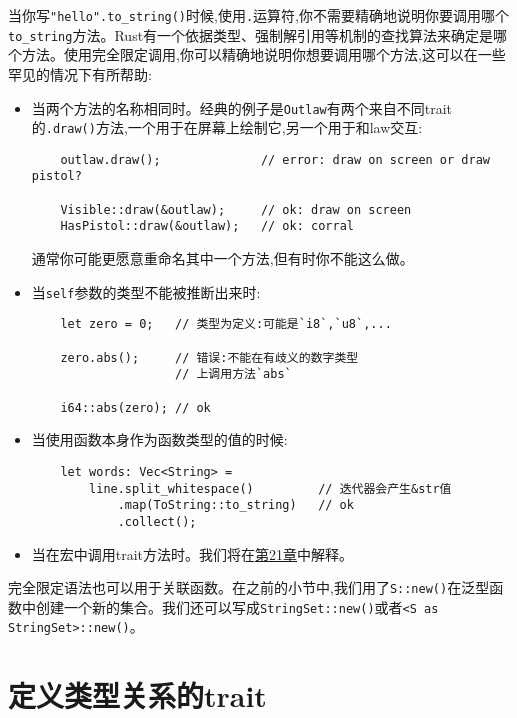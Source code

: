 当你写\texttt{"hello".to\_string()}时候,使用\texttt{.}运算符,你不需要精确地说明你要调用哪个\texttt{to\_string}方法。Rust有一个依据类型、强制解引用等机制的查找算法来确定是哪个方法。使用完全限定调用,你可以精确地说明你想要调用哪个方法,这可以在一些罕见的情况下有所帮助:
\begin{itemize}
    \item 当两个方法的名称相同时。经典的例子是\texttt{Outlaw}有两个来自不同trait的\texttt{.draw()}方法,一个用于在屏幕上绘制它,另一个用于和law交互:
    \begin{verbatim}
    outlaw.draw();              // error: draw on screen or draw pistol?

    Visible::draw(&outlaw);     // ok: draw on screen
    HasPistol::draw(&outlaw);   // ok: corral
    \end{verbatim}

    通常你可能更愿意重命名其中一个方法,但有时你不能这么做。

    \item 当\texttt{self}参数的类型不能被推断出来时:
    \begin{verbatim}
    let zero = 0;   // 类型为定义:可能是`i8`,`u8`,...

    zero.abs();     // 错误:不能在有歧义的数字类型
                    // 上调用方法`abs`

    i64::abs(zero); // ok
    \end{verbatim}

    \item 当使用函数本身作为函数类型的值的时候:
    \begin{verbatim}
    let words: Vec<String> =
        line.split_whitespace()         // 迭代器会产生&str值
            .map(ToString::to_string)   // ok
            .collect();
    \end{verbatim}

    \item 当在宏中调用trait方法时。我们将在\hyperref[ch21]{第21章}中解释。
\end{itemize}

完全限定语法也可以用于关联函数。在之前的小节中,我们用了\texttt{S::new()}在泛型函数中创建一个新的集合。我们还可以写成\texttt{StringSet::new()}或者\texttt{<S as StringSet>::new()}。

\section{定义类型关系的trait}

